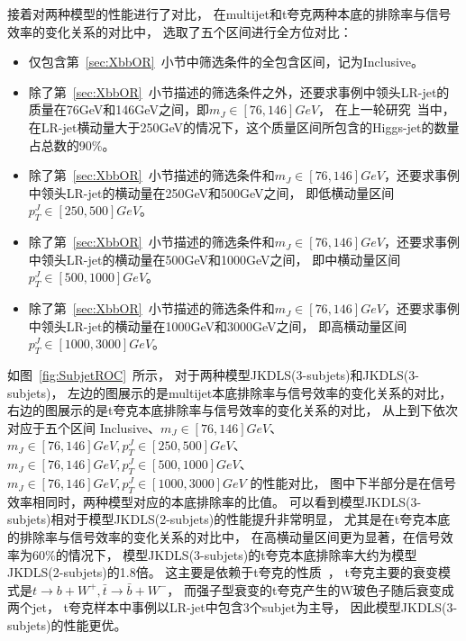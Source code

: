 接着对两种模型的性能进行了对比，
在multijet和t夸克两种本底的排除率与信号效率的变化关系的对比中，
选取了五个区间进行全方位对比：
\begin{itemize}
       \item 仅包含第~\ref{sec:XbbOR}~小节中筛选条件的全包含区间，记为Inclusive。
       \item 除了第~\ref{sec:XbbOR}~小节描述的筛选条件之外，还要求事例中领头LR-jet的质量在76GeV和146GeV之间，即$m_{J}\in[76,146]GeV$， 
       在上一轮研究~\cite{TAGGING5}当中，在LR-jet横动量大于250GeV的情况下，这个质量区间所包含的Higgs-jet的数量占总数的90\%。
       \item 除了第~\ref{sec:XbbOR}~小节描述的筛选条件和$m_{J}\in [76,146]GeV$，还要求事例中领头LR-jet的横动量在250GeV和500GeV之间，
       即低横动量区间$p_{T}^{J}\in [250,500]GeV$。
       \item 除了第~\ref{sec:XbbOR}~小节描述的筛选条件和$m_{J}\in [76,146]GeV$，还要求事例中领头LR-jet的横动量在500GeV和1000GeV之间，
       即中横动量区间$p_{T}^{J}\in [500,1000]GeV$。
       \item 除了第~\ref{sec:XbbOR}~小节描述的筛选条件和$m_{J}\in [76,146]GeV$，还要求事例中领头LR-jet的横动量在1000GeV和3000GeV之间，
       即高横动量区间$p_{T}^{J}\in [1000,3000]GeV$。
\end{itemize}
如图~\ref{fig:SubjetROC}~所示，
对于两种模型JKDLS(3-subjets)和JKDLS(3-subjets)，
左边的图展示的是multijet本底排除率与信号效率的变化关系的对比，
右边的图展示的是t夸克本底排除率与信号效率的变化关系的对比，
从上到下依次对应于五个区间
Inclusive、$m_{J}\in [76,146]GeV$、
$m_{J}\in [76,146]GeV, p_{T}^{J}\in [250,500]GeV$、
$m_{J}\in [76,146]GeV, p_{T}^{J}\in [500,1000]GeV$、
$m_{J}\in [76,146]GeV, p_{T}^{J}\in [1000,3000]GeV$
的性能对比，
图中下半部分是在信号效率相同时，两种模型对应的本底排除率的比值。
可以看到模型JKDLS(3-subjets)相对于模型JKDLS(2-subjets)的性能提升非常明显，
尤其是在t夸克本底的排除率与信号效率的变化关系的对比中，
在高横动量区间更为显著，在信号效率为60\%的情况下，
模型JKDLS(3-subjets)的t夸克本底排除率大约为模型JKDLS(2-subjets)的1.8倍。
这主要是依赖于t夸克的性质~\cite{PDG}，
t夸克主要的衰变模式是$t\to b+W^+, \bar{t}\to \bar{b}+W^-$，
而强子型衰变的t夸克产生的W玻色子随后衰变成两个jet，
t夸克样本中事例以LR-jet中包含3个subjet为主导，
因此模型JKDLS(3-subjets)的性能更优。



